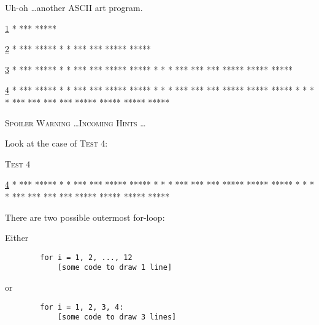 Uh-oh \dots another ASCII art program.

\resett
\nextt
\begin{console}[frame=single, commandchars=\\\{\}]
\underline{1}
  *
 ***
*****
\end{console}

\nextt
\begin{console}[frame=single, commandchars=\\\{\}]
\underline{2}
     *
    ***
   *****
  *     *
 ***   *** 
***** *****
\end{console}

\nextt
\begin{console}[frame=single, commandchars=\\\{\}]
\underline{3}
        *
       ***
      *****
     *     *
    ***   *** 
   ***** *****
  *     *     *
 ***   ***   ***
***** ***** *****
\end{console}

\nextt
\begin{console}[frame=single, commandchars=\\\{\}]
\underline{4}
           *
          ***
         *****
        *     *
       ***   *** 
      ***** *****
     *     *     *
    ***   ***   ***
   ***** ***** *****
  *     *     *     *
 ***   ***   ***   ***
***** ***** ***** *****
\end{console}


\newpage
\textsc{Spoiler Warning \dots Incoming Hints \dots}

Look at the case of \textsc{Test 4}:

\textsc{Test 4}
\begin{console}[frame=single, commandchars=\\\{\}]
\underline{4}
           *
          ***
         *****
        *     *
       ***   *** 
      ***** *****
     *     *     *
    ***   ***   ***
   ***** ***** *****
  *     *     *     *
 ***   ***   ***   ***
***** ***** ***** *****
\end{console} 

There are two possible outermost for-loop: 

Either
\begin{verbatim}
        for i = 1, 2, ..., 12
            [some code to draw 1 line]
\end{verbatim}

or
\begin{verbatim}
        for i = 1, 2, 3, 4:
            [some code to draw 3 lines]
\end{verbatim}

